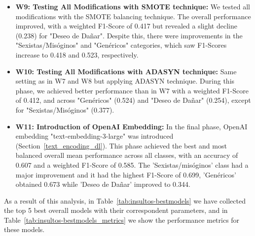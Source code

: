 \begin{itemize}
    \item \textbf{W9: Testing All Modifications with SMOTE technique:} We tested all modifications with the SMOTE balancing technique. The overall performance improved, with a weighted F1-Score of 0.417 but revealed a slight decline (0.238) for "Deseo de Dañar". Despite this, there were improvements in the "Sexistas/Misóginos" and "Genéricos" categories, which saw F1-Scores increase to 0.418 and 0.523, respectively.


    \item \textbf{W10: Testing All Modifications with ADASYN technique:} Same setting as in W7 and W8 but applying ADASYN technique. During this phase, we achieved better performance than in W7 with a weighted F1-Score of 0.412, and across "Genéricos" (0.524) and "Deseo de Dañar" (0.254), except for "Sexistas/Misóginos" (0.377).


    \item \textbf{W11: Introduction of OpenAI Embedding:} In the final phase, OpenAI embedding "text-embedding-3-large" was introduced (Section~\ref{text_encoding_dl}). This phase achieved the best and most balanced overall mean performance across all classes, with an accuracy of 0.607 and a weighted F1-Score of 0.585. The 'Sexistas/misóginos' class had a major improvement and it had the highest F1-Score of 0.699, 'Genéricos' obtained 0.673 while 'Deseo de Dañar' improved to 0.344.
    
    
\end{itemize}



As a result of this analysis, in Table~\ref{tab:insultos-bestmodels} we have collected the top 5 best overall models with their correspondent parameters, and in Table~\ref{tab:insultos-bestmodels_metrics} we show the performance metrics for these models.

